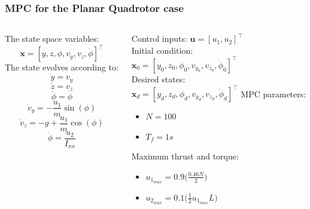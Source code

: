 \documentclass{thesisbeamer}
\begin{document}
\begin{frame}
	\frametitle{MPC for the Planar Quadrotor case}
	
    \begin{columns}
        \begin{column}{0.5\textwidth}
            The state space variables:
            \begin{equation}
                \bm{x} = [y, z, \phi, v_y, v_z, \dot{\phi}]^{\intercal}
            \end{equation}
            The state evolves according to: 
            \begin{equation}
                \dot{y} = v_y
            \end{equation}
            \begin{equation}
                \dot{z} = v_z
            \end{equation}
            \begin{equation}
                \dot{\phi} = \dot{\phi}
            \end{equation}
            \begin{equation}
                \dot{v}_y = - \frac{u_1}{m} \sin(\phi)
            \end{equation}
            \begin{equation}
                \dot{v}_z = - g + \frac{u_1}{m} \cos(\phi)
            \end{equation}
            \begin{equation}
                \ddot{\phi} = \frac{u_2}{I_{xx}}
            \end{equation}   
        \end{column}
        \begin{column}{0.5\textwidth}
            Control inputs:
            $\bm{u} = [u_1, u_2]^{\intercal}$\\
            Initial condition: \\
            $\bm{x}_0 = [ y_0, z_0, \phi_0, v_{y_0}, v_{z_0}, \ddot{\phi}_0]^{\intercal}$\\
            \vfill
            Desired states: \\
            $\bm{x}_d = [y_d,z_d,\phi_d, v_{y_d},v_{z_d},\ddot{\phi}_d]^{\intercal}$
            \vfill
            MPC parameters: 
            \begin{itemize}
                \item $N = 100$
                \item $T_f = 1s$
            \end{itemize}
            Maximum thrust and torque:
            \begin{itemize}
                \item $u_{1_{max}} = 0.9 \bigg(\frac{0.46 N }{2}\bigg)$
                \item $u_{2_{max}} = 0.1 \bigg(\frac{1}{2} u_{1_{max}} L \bigg)$ 
            \end{itemize}
        \end{column}
    \end{columns}
\end{frame}
\end{document}
